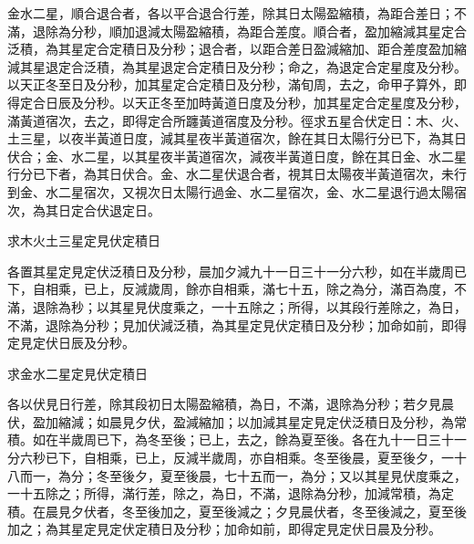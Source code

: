 \begin{pinyinscope}
 金水二星，順合退合者，各以平合退合行差，除其日太陽盈縮積，為距合差日；不滿，退除為分秒，順加退減太陽盈縮積，為距合差度。順合者，盈加縮減其星定合泛積，為其星定合定積日及分秒；退合者，以距合差日盈減縮加、距合差度盈加縮減其星退定合泛積，為其星退定合定積日及分秒；命之，為退定合定星度及分秒。以天正冬至日及分秒，加其星定合定積日及分秒，滿旬周，去之，命甲子算外，即得定合日辰及分秒。以天正冬至加時黃道日度及分秒，加其星定合定星度及分秒，滿黃道宿次，去之，即得定合所躔黃道宿度及分秒。徑求五星合伏定日：木、火、土三星，以夜半黃道日度，減其星夜半黃道宿次，餘在其日太陽行分已下，為其日伏合；金、水二星，以其星夜半黃道宿次，減夜半黃道日度，餘在其日金、水二星行分已下者，為其日伏合。金、水二星伏退合者，視其日太陽夜半黃道宿次，未行到金、水二星宿次，又視次日太陽行過金、水二星宿次，金、水二星退行過太陽宿次，為其日定合伏退定日。



 求木火土三星定見伏定積日



 各置其星定見定伏泛積日及分秒，晨加夕減九十一日三十一分六秒，如在半歲周已下，自相乘，已上，反減歲周，餘亦自相乘，滿七十五，除之為分，滿百為度，不滿，退除為秒；以其星見伏度乘之，一十五除之；所得，以其段行差除之，為日，不滿，退除為分秒；見加伏減泛積，為其星定見伏定積日及分秒；加命如前，即得定見定伏日辰及分秒。



 求金水二星定見伏定積日



 各以伏見日行差，除其段初日太陽盈縮積，為日，不滿，退除為分秒；若夕見晨伏，盈加縮減；如晨見夕伏，盈減縮加；以加減其星定見定伏泛積日及分秒，為常積。如在半歲周已下，為冬至後；已上，去之，餘為夏至後。各在九十一日三十一分六秒已下，自相乘，已上，反減半歲周，亦自相乘。冬至後晨，夏至後夕，一十八而一，為分；冬至後夕，夏至後晨，七十五而一，為分；又以其星見伏度乘之，一十五除之；所得，滿行差，除之，為日，不滿，退除為分秒，加減常積，為定積。在晨見夕伏者，冬至後加之，夏至後減之；夕見晨伏者，冬至後減之，夏至後加之；為其星定見定伏定積日及分秒；加命如前，即得定見定伏日晨及分秒。



\end{pinyinscope}